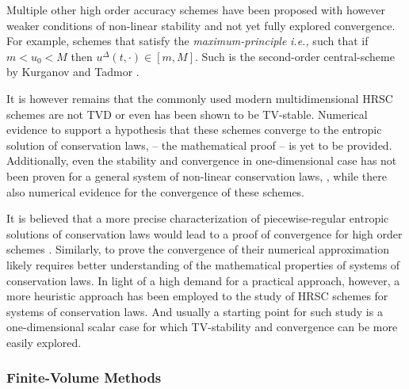 Multiple other high order accuracy schemes have been proposed with however weaker conditions of non-linear stability and not yet fully explored convergence. 
For example, schemes that satisfy the \textit{maximum-principle} \textit{i.e.,} such that if $m < u_0 < M$ then $u^{\Delta}(t,\cdot)\in[m, M]$. 
Such is the second-order central-scheme by Kurganov and Tadmor \cite{Kurganov:2000}. 

It is however remains that the commonly used modern multidimensional HRSC schemes are not TVD or even has been shown to be TV-stable. 
Numerical evidence to support a hypothesis that these schemes converge to the entropic solution of conservation laws, -- the mathematical proof -- is yet to be provided. 
Additionally, even the stability and convergence in one-dimensional case has not been proven for a general system of non-linear conservation laws, \cite{LeVeque:2002}, while there also numerical evidence for the convergence of these schemes. 

It is believed that a more precise characterization of piecewise-regular entropic solutions of conservation laws would lead to a proof of convergence for high order schemes \cite{Tadmor1998}.
Similarly, to prove the convergence of their numerical approximation likely requires  better understanding of the mathematical properties of systems of conservation laws. 
In light of a high demand for a practical approach, however, a more heuristic approach has been employed to the study of HRSC schemes for systems of conservation laws. 
And usually a starting point for such study is a one-dimensional scalar case for which TV-stability and convergence can be more easily explored.


\subsubsection{Finite-Volume Methods}

















